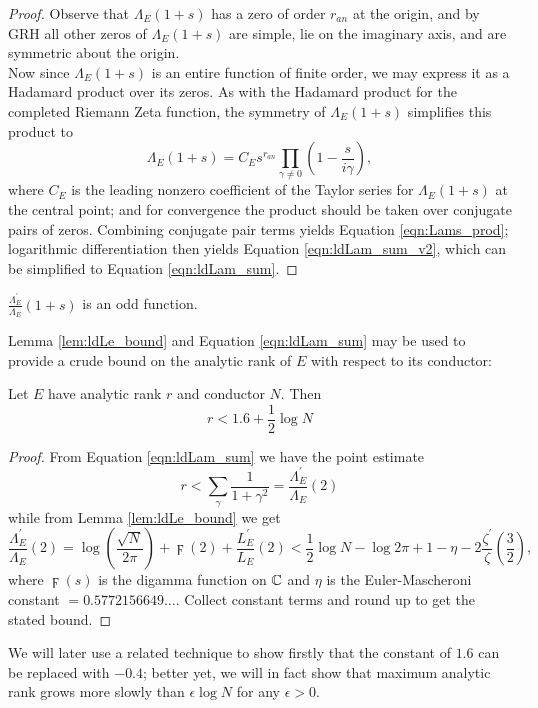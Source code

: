 \documentclass[10pt]{article}
\newcommand{\pr}{^{\prime}}
\newcommand{\ldLe}[1]{\frac{L_E\pr}{L_E}\left(#1\right)}
\newcommand{\ldLam}[1]{\frac{\Lambda_E\pr}{\Lambda_E}\left(#1\right)}
\begin{document}
\begin{proof}
Observe that $\Lambda_E(1+s)$ has a zero of order $r_{an}$ at the origin, and by GRH all other zeros of $\Lambda_E(1+s)$ are simple, lie on the imaginary axis, and are symmetric about the origin. \\

Now since $\Lambda_E(1+s)$ is an entire function of finite order, we may express it as a Hadamard product over its zeros. As with the Hadamard product for the completed Riemann Zeta function, the symmetry of $\Lambda_E(1+s)$ simplifies this product to
\begin{equation}
\Lambda_E(1+s) = C_E s^{r_{an}}\prod_{\gamma\ne0}\left(1-\frac{s}{i\gamma}\right),
\end{equation}
where $C_E$ is the leading nonzero coefficient of the Taylor series for $\Lambda_E(1+s)$ at the central point; and for convergence the product should be taken over conjugate pairs of zeros. Combining conjugate pair terms yields Equation \ref{eqn:Lams_prod}; logarithmic differentiation then yields Equation \ref{eqn:ldLam_sum_v2}, which can be simplified to Equation \ref{eqn:ldLam_sum}.
\end{proof}

\begin{corollary}
$\ldLam{1+s}$ is an odd function.
\end{corollary}

Lemma \ref{lem:ldLe_bound} and Equation \ref{eqn:ldLam_sum} may be used to provide a crude bound on the analytic rank of $E$ with respect to its conductor:
\begin{corollary}\label{cor:logderiv_rank_bound}
Let $E$ have analytic rank $r$ and conductor $N$. Then
\begin{equation}
r < 1.6 + \frac{1}{2} \log N
\end{equation}
\end{corollary}
\begin{proof}
From Equation \ref{eqn:ldLam_sum} we have the point estimate
\begin{equation}
r < \sum_{\gamma} \frac{1}{1+\gamma^2} = \ldLam{2}
\end{equation}
while from Lemma \ref{lem:ldLe_bound} we get
\begin{equation}
\ldLam{2} =  \log\left(\frac{\sqrt{N}}{2\pi}\right) + \digamma(2) + \ldLe{2} < \frac{1}{2}\log N  - \log 2\pi + 1-\eta -2\frac{\zeta\pr}{\zeta}\left(\frac{3}{2}\right),
\end{equation}
where $\digamma(s)$ is the digamma function on $\mathbb{C}$ and $\eta$ is the Euler-Mascheroni constant $= 0.5772156649\ldots$. Collect constant terms and round up to get the stated bound.
\end{proof}
We will later use a related technique to show firstly that the constant of $1.6$ can be replaced with $-0.4$; better yet, we will in fact show that maximum analytic rank grows more slowly than $\epsilon \log N$ for any $\epsilon>0$. \\
\end{document}
